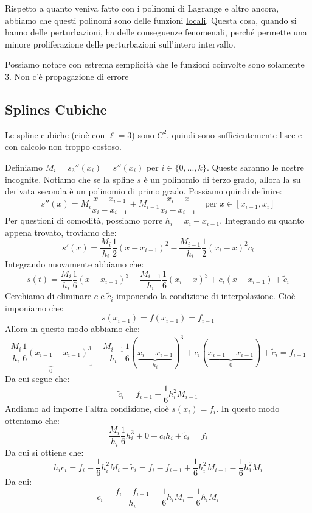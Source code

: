 \documentclass[11pt,a4paper,twoside]{article}
\theoremstyle{definition}
\begin{document}
Rispetto a quanto veniva fatto con i polinomi di Lagrange e altro ancora, abbiamo che questi polinomi sono delle funzioni \underline{locali}. Questa cosa, quando si hanno delle perturbazioni, ha delle conseguenze fenomenali, perché permette una minore proliferazione delle perturbazioni sull'intero intervallo.

\begin{center}
\end{center}
Possiamo notare con estrema semplicità che le funzioni coinvolte sono solamente $3$. Non c'è propagazione di errore

\subsection{Splines Cubiche}

Le spline cubiche (cioè con $\ell = 3$) sono $C^2$, quindi sono sufficientemente lisce e con calcolo non troppo costoso.

Definiamo $M_i = s_3''(x_i) = s''(x_i)$ per $i \in \{0,...,k\}$. Queste saranno le nostre incognite. Notiamo che se la spline $s$ è un polinomio di terzo grado, allora la su derivata seconda è un polinomio di primo grado. Possiamo quindi definire:
\[ s''(x) = M_i \frac{x-x_{i-1}}{x_i-x_{i-1}} + M_{i-1} \frac{x_i-x}{x_i-x_{i-1}} \quad \text{per }x \in [x_{i-1}, x_i]\]
Per questioni di comodità, possiamo porre $h_i = x_i- x_{i-1}$. Integrando su quanto appena trovato, troviamo che:
\[ s'(x) = \frac{M_i}{h_i} \frac 12 (x-x_{i-1})^2 - \frac{M_{i-1}}{h_i}\frac 12 (x_i-x)^2 c_i \]
Integrando nuovamente abbiamo che:
\[ s(t) = \frac{M_i}{h_i} \frac 16 (x-x_{i-1})^3 + \frac{M_{i-1}}{h_i} \frac 16 (x_i - x)^3 + c_i(x-x_{i-1}) + \tilde c_i \]
Cerchiamo di eliminare $c$ e $\tilde c_i$ imponendo la condizione di interpolazione. Cioè imponiamo che:
\[ s(x_{i-1}) = f(x_{i-1}) = f_{i-1} \]
Allora in questo modo abbiamo che:
\[ \underbrace{\frac{M_i}{h_i}\frac 16 (x_{i-1}-x_{i-1})^3}_0 + \frac{M_{i-1}}{h_i} \frac 16 (\underbrace{x_i - x_{i-1}}_{h_i})^3 + c_i(\underbrace{x_{i-1} - x_{i-1}}_0) + \tilde c_i = f_{i-1}\]
Da cui segue che:
\[ \tilde c_i = f_{i-1} - \frac 16 h_i^2 M_{i-1} \]
Andiamo ad imporre l'altra condizione, cioè $s(x_i) = f_i$. In questo modo otteniamo che:
\[ \frac{M_i}{h_i} \frac 16 h_i^3 + 0 + c_i h_i + \tilde c_i = f_i \]
Da cui si ottiene che:
\[ h_ic_i = f_i - \frac 16 h_i^2M_i - \tilde c_i = f_i - f_{i-1} + \frac 16 h_i^2 M_{i-1} - \frac 16 h^2_1 M_i \]
Da cui:
\[ c_i = \frac{f_i - f_{i-1}}{h_i} = \frac 16 h_iM_i - \frac 16 h_iM_i \]
\end{document}
